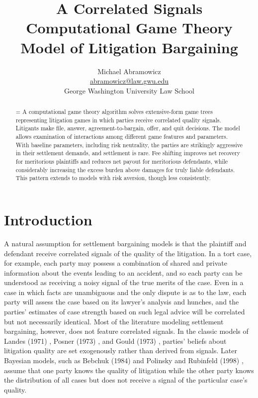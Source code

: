 \documentclass{article}
\newenvironment{nohyphen}
  {\tolerance=1%
   \emergencystretch=\maxdimen%
   \hyphenpenalty=10000%
   \hbadness=10000}%
  {\par}%
\begin{document}
\title{A Correlated Signals \\ Computational Game Theory \\ Model of Litigation Bargaining}
\author{Michael Abramowicz \\ \href{mailto:abramowicz@law.gwu.edu}{abramowicz@law.gwu.edu} \\ George Washington University Law School}

\maketitle

\begin{abstract}
\begin{nohyphen}
A computational game theory algorithm solves extensive-form game trees representing litigation games in which parties receive correlated quality signals. Litigants make file, answer, agreement-to-bargain, offer, and quit decisions. The model allows examination of interactions among different game features and parameters. With baseline parameters, including risk neutrality, the parties are strikingly aggressive in their settlement demands, and settlement is  rare. Fee shifting improves net recovery for meritorious plaintiffs and reduces net payout for meritorious defendants, while considerably increasing the excess burden above damages for truly liable defendants. This pattern extends to models with risk aversion, though less consistently. 
\end{nohyphen}
\end{abstract}

\section{Introduction}

A natural assumption for settlement bargaining models is that the plaintiff and defendant receive correlated signals of the quality of the litigation. In a tort case, for example, each party may possess a combination of shared and private information about the events leading to an accident, and so each party can be understood as receiving a noisy signal of the true merits of the case. Even in a case in which facts are unambiguous and the only dispute is as to the law, each party will assess the case based on its lawyer's analysis and hunches, and the parties' estimates of case strength based on such legal advice will be correlated but not necessarily identical. Most of the literature modeling settlement bargaining, however, does not feature correlated signals. In the classic models of Landes (1971) \cite{landes}, Posner (1973) \cite{posner}, and Gould (1973) \cite{gould}, parties' beliefs about litigation quality are set exogenously rather than derived from signals. Later Bayesian models, such as Bebchuk (1984) \cite{bebchuk84} and Polinsky and Rubinfeld (1998) \cite{polinskyrubinfeld}, assume that one party knows the quality of litigation while the other party knows the distribution of all cases but does not receive a signal of the particular case's quality. 
\end{document}
